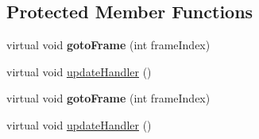 \subsection*{Protected Member Functions}
\begin{DoxyCompactItemize}
\item 
\mbox{\label{classcocostudio_1_1ProcessBase_a76721aad9251912c619749db5c281a53}} 
virtual void {\bfseries goto\+Frame} (int frame\+Index)
\item 
virtual void \hyperlink{classcocostudio_1_1ProcessBase_adb15615e852617daf7a4f13b17bfc553}{update\+Handler} ()
\item 
\mbox{\label{classcocostudio_1_1ProcessBase_a6547a6c59fb6164006031cbebda1662b}} 
virtual void {\bfseries goto\+Frame} (int frame\+Index)
\item 
virtual void \hyperlink{classcocostudio_1_1ProcessBase_adb15615e852617daf7a4f13b17bfc553}{update\+Handler} ()
\end{DoxyCompactItemize}
